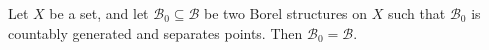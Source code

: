 Let $X$ be a set, and let $\mathcal{B}_0 \subseteq \mathcal{B}$ be two Borel structures on $X$ such that $\mathcal{B}_0$ is countably generated and separates points. Then $\mathcal{B}_0 = \mathcal{B}$.
